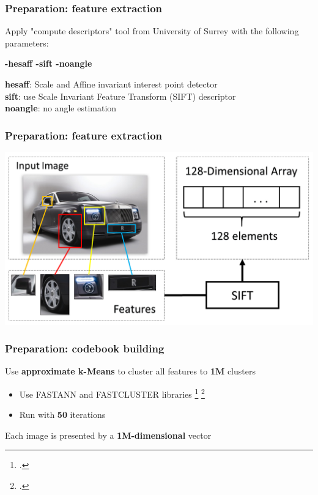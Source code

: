 \begin{frame}
    \frametitle{Preparation: feature extraction}
    Apply "compute descriptors" tool from \alert{University of Surrey} with the following parameters:
    \begin{center}
        \textbf{-hesaff -sift -noangle}
    \end{center}
    \textbf{hesaff}: Scale and Affine invariant interest point detector\\
    \textbf{sift}: use Scale Invariant Feature Transform (SIFT) descriptor\\
    \textbf{noangle}: no angle estimation
\end{frame}

\begin{frame}
    \frametitle{Preparation: feature extraction}
    \begin{center}
    \includegraphics[width=\textwidth]{images/feature_extraction2.png}
    \end{center}
\end{frame}

\begin{frame}
    \frametitle{Preparation: codebook building}
    Use \textbf{approximate k-Means} to cluster all features to \textbf{1M} clusters
    \begin{itemize}
        \item Use \alert{FASTANN} and \alert{FASTCLUSTER} libraries \footcite{Muja M. and Lowe D., Fast approximate nearest neighbours with automatic algorithm configuration, Proceedings VISAPP 2009} \footcite{Philbin J. Chum O. Isard M. Sivic J. and Zisserman A., Object retrieval with large vocabularies and fast spatial matching, Proceedings CVPR 2007}
        \item Run with \textbf{50} iterations
    \end{itemize}
    Each image is presented by a \textbf{1M-dimensional} vector
\end{frame}

